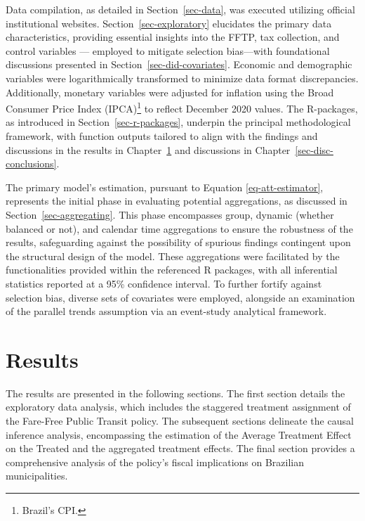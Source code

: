 \documentclass[12pt, a4paper, twoside]{article}
\numberwithin{equation}{subsection} %
\begin{document}
Data compilation, as detailed in Section~\ref{sec-data}, was executed
utilizing official institutional websites. Section~\ref{sec-exploratory}
elucidates the primary data characteristics, providing essential
insights into the FFTP, tax collection, and control variables ---
employed to mitigate selection bias---with foundational discussions
presented in Section~\ref{sec-did-covariates}. Economic and demographic
variables were logarithmically transformed to minimize data format
discrepancies. Additionally, monetary variables were adjusted for
inflation using the Broad Consumer Price Index (IPCA)\footnote{Brazil's
  CPI.} to reflect December 2020 values. The R-packages, as introduced
in Section~\ref{sec-r-packages}, underpin the principal methodological
framework, with function outputs tailored to align with the findings and
discussions in the results in Chapter~\ref{sec-results} and discussions
in Chapter~\ref{sec-disc-conclusions}.

The primary model's estimation, pursuant to Equation
\eqref{eq-att-estimator}, represents the initial phase in evaluating
potential aggregations, as discussed in Section~\ref{sec-aggregating}.
This phase encompasses group, dynamic (whether balanced or not), and
calendar time aggregations to ensure the robustness of the results,
safeguarding against the possibility of spurious findings contingent
upon the structural design of the model. These aggregations were
facilitated by the functionalities provided within the referenced R
packages, with all inferential statistics reported at a 95\% confidence
interval. To further fortify against selection bias, diverse sets of
covariates were employed, alongside an examination of the parallel
trends assumption via an event-study analytical framework.

\newpage

\hypertarget{sec-results}{%
\section{Results}\label{sec-results}}

The results are presented in the following sections. The first section
details the exploratory data analysis, which includes the staggered
treatment assignment of the Fare-Free Public Transit policy. The
subsequent sections delineate the causal inference analysis,
encompassing the estimation of the Average Treatment Effect on the
Treated and the aggregated treatment effects. The final section provides
a comprehensive analysis of the policy's fiscal implications on
Brazilian municipalities.
\end{document}
